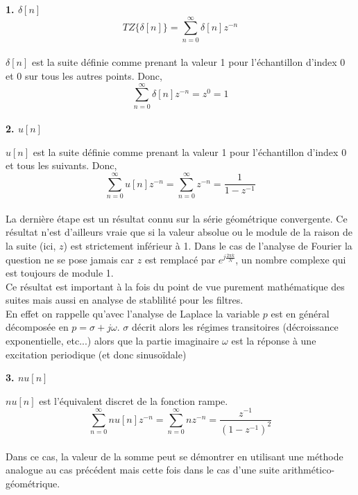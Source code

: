 \documentclass[11pt,a4paper]{article}
\begin{document}
\textbf{1. $\delta[n]$}
\[TZ\{ \delta[n] \} = \sum_{n = 0}^{\infty} \delta[n] z^{-n}\] \\

$\delta[n]$ est la suite définie comme prenant la valeur 1 pour l'échantillon d'index 0 et 0 sur tous les autres points. Donc,\\

\[\sum_{n = 0}^{\infty} \delta[n] z^{-n} = z^0 = 1 \]\\

\textbf{2. $u[n]$}

$u[n]$ est la suite définie comme prenant la valeur 1 pour l'échantillon d'index 0 et tous les suivants. Donc,\\

\[\sum_{n = 0}^{\infty} u[n] z^{-n} = \sum_{n = 0}^{\infty} z^{-n}  = \frac{1}{1-z^{-1}} \]\\

La dernière étape est un résultat connu sur la série géométrique convergente. Ce résultat n'est d'ailleurs vraie que si la valeur absolue ou le module de la raison de la suite (ici, $z$) est strictement inférieur à 1.  Dans le cas de l'analyse de Fourier la question ne se pose jamais car $z$ est remplacé par $e^{j\frac{2 \pi k }{N}}$, un nombre complexe qui est toujours de  module 1.\\

Ce résultat est important à la fois du point de vue purement mathématique des suites mais aussi en analyse de stablilité pour les filtres.\\

En effet on rappelle qu'avec l'analyse de  Laplace la variable $p$ est en général décomposée en $p = \sigma + j \omega$.  $\sigma$ décrit alors les régimes transitoires (décroissance exponentielle, etc...) alors que la partie imaginaire $\omega$ est la réponse à une excitation periodique (et donc sinusoïdale)

\textbf{3. $nu[n]$}

 $nu[n]$ est l'équivalent discret de la fonction rampe.\\
 

\[\sum_{n = 0}^{\infty} n u[n] z^{-n} = \sum_{n = 0}^{\infty} n z^{-n}  = \frac{z^{-1}}{(1-z^{-1})^2} \]\\ 

Dans ce cas, la valeur de la somme peut se démontrer en utilisant une méthode analogue au cas précédent mais cette fois dans le cas d'une suite arithmético-géométrique.

\end{document}
